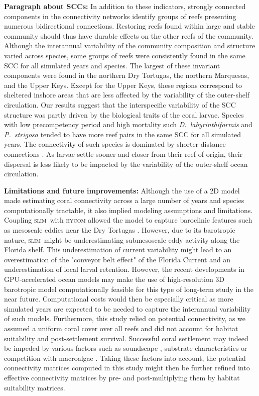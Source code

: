 \documentclass[preprint,12pt,authoryear]{elsarticle}
\newcommand{\hycom}{\textsc{hycom} }
\newcommand{\slim}{\textsc{slim}\ }
\begin{document}
	\textbf{Paragraph about SCCs:} In addition to these indicators, strongly connected components in the connectivity networks identify groups of reefs presenting numerous bidirectional connections. Restoring reefs found within large and stable community should thus have durable effects on the other reefs of the community. Although the interannual variability of the community composition and structure varied across species, some groups of reefs were consistently found in the same SCC for all simulated years and species. The largest of these invariant components were found in the northern Dry Tortugas, the northern Marquesas, and the Upper Keys. Except for the Upper Keys, these regions correspond to sheltered inshore areas that are less affected by the variability of the outer-shelf circulation. Our results suggest that the interspecific variability of the SCC structure was partly driven by the biological traits of the coral larvae. Species with low precompetency period and high mortality such \textit{D.~labyrinthiformis} and \textit{P.~strigosa} tended to have more reef pairs in the same SCC for all simulated years. The connectivity of such species is dominated by shorter-distance connections \citep{figueiredo2022global}. As larvae settle sooner and closer from their reef of origin, their dispersal is less likely to be impacted by the variability of the outer-shelf ocean circulation.
	
	
	\textbf{Limitations and future improvements:} Although the use of a 2D model made estimating coral connectivity across a large number of years and species computationally tractable, it also implied modeling assumptions and limitations. Coupling \slim with \hycom allowed the model to capture baroclinic features such as mesoscale eddies near the Dry Tortugas \citep{dobbelaere2022connecting}. However, due to its barotropic nature, \slim might be underestimating submesoscale eddy activity along the Florida shelf. This underestimation of current variability might lead to an overestimation of the "conveyor belt effect" of the Florida Current \citep{frys2020fine} and an underestimation of local larval retention. However, the recent developments in GPU-accelerated ocean models may make the use of high-resolution 3D barotropic model computationally feasible for this type of long-term study in the near future. Computational costs would then be especially critical as more simulated years are expected to be needed to capture the interannual variability of such models. Furthermore, this study relied on potential connectivity, as we assumed a uniform coral cover over all reefs and did not account for habitat suitability and post-settlement survival. Successful coral settlement may indeed be impeded by various factors such as soundscape \cite{lillis2016variation}, substrate characteristics \citep{jorissen2021coral} or competition with macroalgae \cite{webster2015macroalgae}. Taking these factors into account, the potential connectivity matrices computed in this study might then be further refined into effective connectivity matrices by pre- and post-multiplying them by habitat suitability matrices.
	
\end{document}
